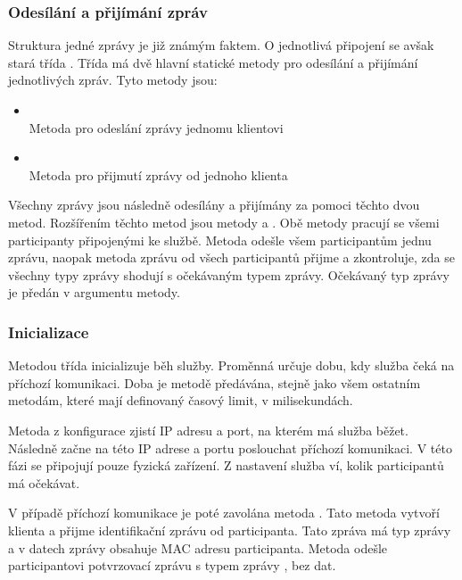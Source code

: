 \subsubsection{Odesílání a přijímání zpráv}
Struktura jedné zprávy je již známým faktem. O jednotlivá připojení se avšak stará třída . Třída má dvě hlavní statické metody pro odesílání a přijímání jednotlivých zpráv. Tyto metody jsou:

\begin{itemize}
    \item {} \\
    Metoda pro odeslání zprávy jednomu klientovi
    \item {} \\
    Metoda pro přijmutí zprávy od jednoho klienta
\end{itemize}

Všechny zprávy jsou následně odesílány a přijímány za pomoci těchto dvou metod. Rozšířením těchto metod jsou metody  a . Obě metody pracují se všemi participanty připojenými ke službě. Metoda  odešle všem participantům jednu zprávu, naopak metoda  zprávu od všech participantů přijme a zkontroluje, zda se všechny typy zprávy shodují s očekávaným typem zprávy. Očekávaný typ zprávy je předán v argumentu metody. 

\subsubsection{Inicializace}

Metodou  třída  inicializuje běh služby. Proměnná  určuje dobu, kdy služba čeká na příchozí komunikaci. Doba je metodě předávána, stejně jako všem ostatním metodám, které mají definovaný časový limit, v milisekundách. 

Metoda z konfigurace zjistí IP adresu a port, na kterém má služba běžet. Následně začne na této IP adrese a portu poslouchat příchozí komunikaci. V této fázi se připojují pouze fyzická zařízení. Z nastavení služba ví, kolik participantů má očekávat. 

V případě příchozí komunikace je poté zavolána metoda . Tato metoda vytvoří klienta a přijme identifikační zprávu od participanta. Tato zpráva má typ zprávy  a v datech zprávy obsahuje MAC adresu participanta. Metoda odešle participantovi potvrzovací zprávu s typem zprávy , bez dat. 

